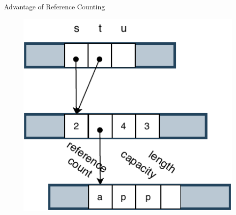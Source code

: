 \documentclass[9pt]{beamer}
\begin{document}
\begin{frame}[t, fragile]{Advantage of Reference Counting}
\begin{minipage}{0.3\linewidth}
\begin{figure}[hp]
        \end{figure}
    \end{minipage}     
    \begin{minipage}{0.3\linewidth}
        \begin{figure}[hp]
            \centering
            \begin{center}
                    \includegraphics[width=1.0\textwidth]{images/rc2.pdf}
                    \captionsetup{labelformat=empty}
            \end{center}
            

\end{figure}
\end{minipage}
\end{frame}
\end{document}
